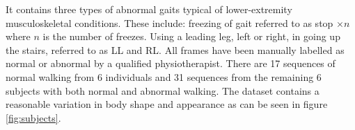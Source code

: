 \documentclass[11pt]{article} %
\begin{document}
It contains three types of abnormal gaits typical of lower-extremity musculoskeletal conditions. These include: freezing of gait referred to as stop $\times n$ where $n$ is the number of freezes. Using a leading leg, left or right, in going up the stairs, referred to as LL and RL. All frames have been manually labelled as normal or abnormal by a qualified physiotherapist. There are 17 sequences of normal walking from 6 individuals and 31 sequences from the remaining 6 subjects with both normal and abnormal walking. The dataset contains a reasonable variation in body shape and appearance as can be seen in figure \ref{fig:subjects}.



\begin{figure}
\centering
{}%
\qquad
{}%
\qquad
{}%
\qquad
{}%

\end{figure}
\end{document}
